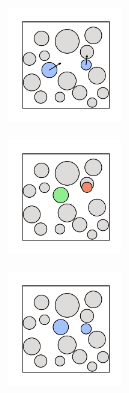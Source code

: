 \begin{figure}[bt]
     \centering
     
     \begin{subfigure}[b]{0.25\textwidth}
         \centering
         \includegraphics[width=3cm]{./figures/methods/mc_move_a.pdf}
         \caption{}
         \label{fig:hardmc1}
     \end{subfigure}
     \begin{subfigure}[b]{0.25\textwidth}
         \centering
         \includegraphics[width=3cm]{./figures/methods/mc_move_b.pdf}
         \caption{}
         \label{fig:hardmc2}
     \end{subfigure}
     \begin{subfigure}[b]{0.25\textwidth}
         \centering
         \includegraphics[width=3cm]{./figures/methods/mc_move_c.pdf}
         \caption{}
         \label{fig:hardmc3}
     \end{subfigure}
     

\end{figure}
